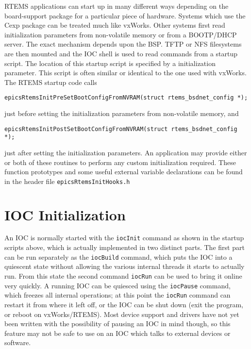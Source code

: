 RTEMS applications can start up in many different ways depending on the board-support package for a particular piece of 
hardware. Systems which use the Cexp package can be treated much like vxWorks.  Other systems first read initialization  
parameters from non-volatile memory or from a BOOTP/DHCP server.  The exact mechanism depends upon the BSP.  
TFTP or NFS filesystems are then mounted and the IOC shell is used to read commands from a startup script.  The 
location of this startup script is specified by a initialization parameter.  This script is often similar or identical to the one 
used with vxWorks.  The RTEMS startup code calls

\begin{verbatim}epicsRtemsInitPreSetBootConfigFromNVRAM(struct rtems_bsdnet_config *);
\end{verbatim}just before setting the initialization parameters from non-volatile memory, and

\begin{verbatim}epicsRtemsInitPostSetBootConfigFromNVRAM(struct rtems_bsdnet_config *);
\end{verbatim}just after setting the initialization parameters.  An application may provide either or both of these routines to perform any 
custom initialization required.  These function prototypes and some useful external variable declarations can be found in 
the header file \verb|epicsRtemsInitHooks.h|

\section{IOC Initialization}

An IOC is normally started with the \verb|iocInit| command as shown in the startup scripts above, which is actually 
implemented in two distinct parts. The first part can be run separately as the \verb|iocBuild| command, which puts the IOC 
into a quiescent state without allowing the various internal threads it starts to actually run. From this state the second 
command \verb|iocRun| can be used to bring it online very quickly. A running IOC can be quiesced using the \verb|iocPause| 
command, which freezes all internal operations; at this point the \verb|iocRun| command can restart it from where it left off, or 
the IOC can be shut down (exit the program, or reboot on vxWorks/RTEMS).  Most device support and drivers have not 
yet been written with the possibility of pausing an IOC in mind though, so this feature may not be safe to use on an IOC 
which talks to external devices or software.

